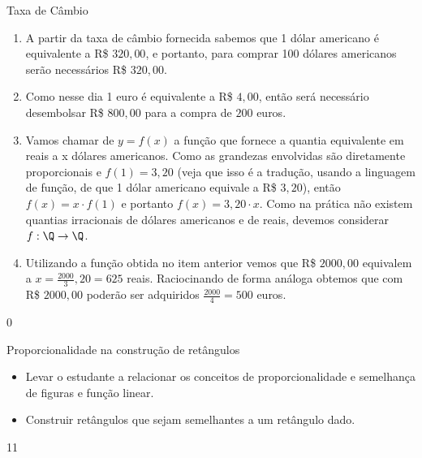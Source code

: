 \begin{answer}{Taxa de Câmbio}
{
\begin{enumerate}

\item A partir da taxa de câmbio fornecida sabemos que 1 dólar americano é equivalente a R\$ $320{,}00$, e portanto, para comprar 100 dólares americanos serão necessários R\$ $320{,}00$. 

\item Como nesse dia 1 euro é equivalente a R\$ $4{,}00$, então será necessário desembolsar R\$ $800{,}00$ para a compra de $200$ euros.

\item Vamos chamar de $y=f(x)$ a função que fornece a quantia equivalente em reais a x dólares americanos. Como as grandezas envolvidas são diretamente proporcionais e $f(1)=3{,}20$ (veja que isso é a tradução, usando a linguagem de função, de que 1 dólar americano equivale a R\$ $3{,}20$), então $f(x)=x\cdot f(1)$ e portanto $f(x)=3{,}20\cdot x$. Como na prática não existem quantias irracionais de dólares americanos e de reais, devemos considerar $f:\Q\rightarrow\Q$.

\item Utilizando a função obtida no item anterior vemos que R\$ $2000,00$ equivalem a $x\displaystyle=\frac{2000}{3}{,}20=625$ reais. Raciocinando de forma análoga obtemos que com R\$ $2000{,}00$ poderão ser adquiridos $\displaystyle\frac{2000}{4}=500$ euros.
\end{enumerate}
}{0}
\end{answer}
\begin{objectives}{Proporcionalidade na construção de retângulos}
{
\begin{itemize}
\item Levar o estudante a relacionar os conceitos de proporcionalidade e semelhança de figuras e função linear.

\item Construir retângulos que sejam semelhantes a um retângulo dado.

\end{itemize}
}{1}{1}
\end{objectives}
\clearmargin
\marginpar{\vspace{.5em}}
